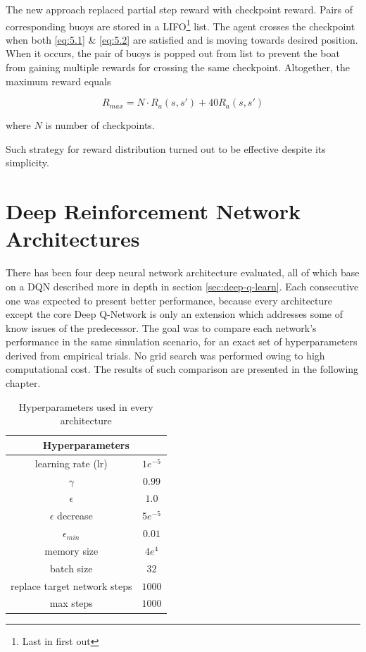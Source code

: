 The new approach replaced partial step reward with checkpoint reward. Pairs of corresponding buoys are stored in a LIFO\footnote{Last in first out} list. The agent crosses the checkpoint when both \ref{eq:5.1} \& \ref{eq:5.2} are satisfied and is moving towards desired position. When it occurs, the pair of buoys is popped out from list to prevent the boat from gaining multiple rewards for crossing the same checkpoint. Altogether, the maximum reward equals 

\begin{equation}
R_{max} = N \cdot R_a(s, s') + 40R_a(s, s')
\end{equation}

where $N$ is number of checkpoints.

Such strategy for reward distribution turned out to be effective despite its simplicity.

\section{Deep Reinforcement Network Architectures}
\label{sec:dnn-architectures}

There has been four deep neural network architecture evaluated, all of which base on a DQN described more in depth in section \ref{sec:deep-q-learn}. Each consecutive one was expected to present better performance, because every architecture except the core Deep Q-Network is only an extension which addresses some of know issues of the predecessor. The goal was to compare each network's performance in the same simulation scenario, for an exact set of hyperparameters derived from empirical trials. No grid search was performed owing to high computational cost. The results of such comparison are presented in the following chapter.

\begin{table}
    \centering
    \begin{tabular}{|c c|}
        \hline
        \multicolumn{2}{|c|}{Hyperparameters} \\
        \hline
        learning rate (lr) & $1e^{-5}$ \\
        $\gamma$ & $0.99$ \\
        $\epsilon$ & $1.0$ \\
        $\epsilon$ decrease & $5e^{-5}$ \\
        $\epsilon_{min}$ & $0.01$ \\
        memory size & $4e^4$ \\
        batch size & $32$ \\
        replace target network steps & $1000$ \\
        max steps & $1000$ \\
        \hline
    \end{tabular}
    \caption{Hyperparameters used in every architecture}
    \label{tab:hyperparameters}
\end{table}

